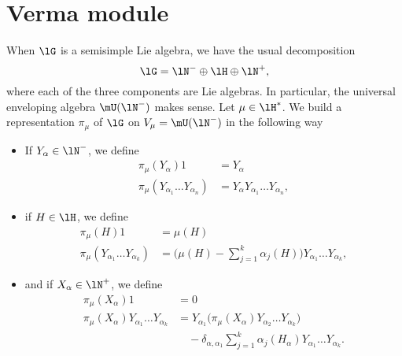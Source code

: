 \section{Verma module}

When $\lG$ is a semisimple Lie algebra, we have the usual decomposition\cite{VermaPiercey}
\begin{equation}
    \lG=\lN^-\oplus\lH\oplus\lN^+,
\end{equation}
where each of the three components are Lie algebras. In particular, the universal enveloping algebra $\mU(\lN^-)$ makes sense. Let $\mu\in\lH^*$. We build a representation $\pi_{\mu}$ of $\lG$ on $V_{\mu}=\mU(\lN^-)$ in the following way
\begin{itemize}
\item If $Y_{\alpha}\in\lN^-$, we define
\begin{subequations}
    \begin{align}
        \pi_{\mu}(Y_{\alpha})1  &=Y_{\alpha}\\
        \pi_{\mu}(Y_{\alpha_1}\ldots Y_{\alpha_n})&=Y_{\alpha}Y_{\alpha_1}\ldots Y_{\alpha_n},
    \end{align}
\end{subequations}
\item if $H\in\lH$, we define
\begin{subequations}
    \begin{align}
        \pi_{\mu}(H)1   &=\mu(H)\\
        \pi_{\mu}(Y_{\alpha_1}\ldots Y_{\alpha_k})  &= \big( \mu(H)-\sum_{j=1}^k\alpha_j(H) \big)Y_{\alpha_1}\ldots Y_{\alpha_k},
    \end{align}
\end{subequations}
\item and if $X_{\alpha}\in\lN^+$, we define
\begin{subequations}
    \begin{align}
        \pi_{\mu}(X_{\alpha})1  &=0\\
        \pi_{\mu}(X_{\alpha})Y_{\alpha_1}\ldots Y_{\alpha_k}    &=Y_{\alpha_1}\big( \pi_{\mu}(X_{\alpha})Y_{\alpha_2}\ldots Y_{\alpha_k} \big)\\
                                    &\quad  -\delta_{\alpha,\alpha_1}\sum_{j=1}^k\alpha_j(H_{\alpha})Y_{\alpha_1}\ldots Y_{\alpha_k}.
    \end{align}
\end{subequations}
\end{itemize}
